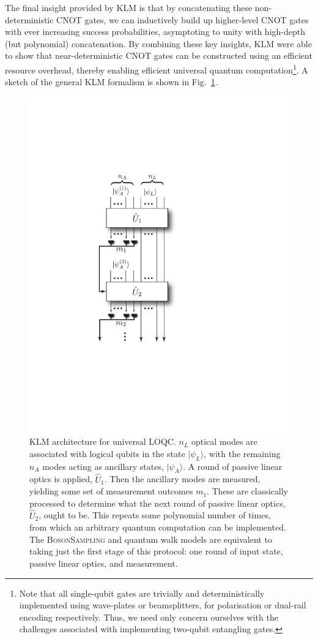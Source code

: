 \documentclass[aps,rmp,twocolumn,amsmath,amssymb,nofootinbib,superscriptaddress,longbibliography,floatfix,table-of-contents,eqsecnum]{revtex4-1}
\newcommand{\ket}[1]{|#1\rangle}
\begin{document}
The final insight provided by KLM is that by concatenating these non-deterministic CNOT gates, we can inductively build up higher-level CNOT gates with ever increasing success probabilities, asymptoting to unity with high-depth (but polynomial) concatenation. By combining these key insights, KLM were able to show that near-deterministic CNOT gates can be constructed using an efficient resource overhead, thereby enabling efficient universal quantum computation\footnote{Note that all single-qubit gates are trivially and deterministically implemented using wave-plates or beamsplitters, for polarisation or dual-rail encoding respectively. Thus, we need only concern ourselves with the challenges associated with implementing two-qubit entangling gates.}. A sketch of the general KLM formalism is shown in Fig.~\ref{fig:KLM_protocol}.

\begin{figure}[!htb]
\includegraphics[width=0.5\columnwidth]{KLM}
\caption{KLM architecture for universal LOQC. $n_L$ optical modes are associated with logical qubits in the state $\ket{\psi_L}$, with the remaining $n_A$ modes acting as ancillary states, $\ket{\psi_A}$. A round of passive linear optics is applied, $\hat{U}_1$. Then the ancillary modes are measured, yielding some set of measurement outcomes $m_1$. These are classically processed to determine what the next round of passive linear optics, $\hat{U}_2$, ought to be. This repeats some polynomial number of times, from which an arbitrary quantum computation can be implemented. The \textsc{BosonSampling} and quantum walk models are equivalent to taking just the first stage of this protocol: one round of input state, passive linear optics, and measurement.} \label{fig:KLM_protocol}
\end{figure}
\end{document}
